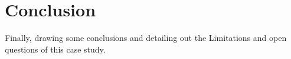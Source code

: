 \section{Conclusion}

Finally, drawing some conclusions and  detailing out the Limitations and open questions of this case study. 